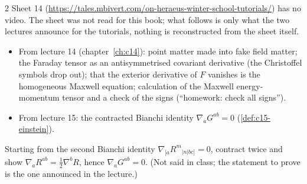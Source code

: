 \begin{paracol}{2}
Sheet 14 (\url{https://tales.mbivert.com/on-heraeus-winter-school-tutorials/}) has no video. The sheet was not read for this book; what follows is only what the two lectures announce for the tutorials, nothing is reconstructed from the sheet itself.
\begin{itemize}
  \item From lecture 14 (chapter~\ref{ch:c14}): point matter made into fake field matter; the Faraday tensor as an antisymmetrised covariant derivative (the Christoffel symbols drop out); that the exterior derivative of $F$ vanishes is the homogeneous Maxwell equation; calculation of the Maxwell energy-momentum tensor and a check of the signs (``homework: check all signs'').
  \item From lecture 15: the contracted Bianchi identity $\nabla_aG^{ab}=0$ (\cref{def:c15-einstein}).
\end{itemize}
\begin{exercise}\label{ex:c15-bianchi}
Starting from the second Bianchi identity $\nabla_{[a}R^{m}{}_{|n|bc]}=0$, contract twice and show $\nabla_aR^{ab}=\tfrac12\nabla^bR$, hence $\nabla_aG^{ab}=0$. (Not said in class; the statement to prove is the one announced in the lecture.)
\end{exercise}


\end{paracol}
